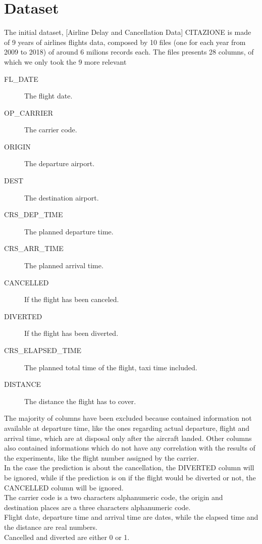 \documentclass[
	letterpaper, %
	10pt, %
]{class}
\begin{document}

\section{Dataset}

The initial dataset, [Airline Delay and Cancellation Data] CITAZIONE is made of 9 years of airlines flights data, composed by 10 files (one for each year from 2009 to 2018) of around 6 milions records each.
The files presents 28 columns, of which we only took the 9 more relevant\\

\begin{description}
	\item[FL\_DATE] The flight date.
	\item[OP\_CARRIER] The carrier code.
	\item[ORIGIN] The departure airport.
	\item[DEST] The destination airport.
	\item[CRS\_DEP\_TIME] The planned departure time.
	\item[CRS\_ARR\_TIME] The planned arrival time.
	\item[CANCELLED] If the flight has been canceled.
	\item[DIVERTED] If the flight has been diverted.
	\item[CRS\_ELAPSED\_TIME] The planned total time of the flight, taxi time included.
	\item[DISTANCE] The distance the flight has to cover.\\
\end{description}

The majority of columns have been excluded because contained information not available at departure time, like the ones regarding actual departure, flight and arrival time, which are at disposal only after the aircraft landed.
Other columns also contained informations which do not have any correlation with the results of the experiments, like the flight number assigned by the carrier.\\

In the case the prediction is about the cancellation, the DIVERTED column will be ignored, while if the prediction is on if the flight would be diverted or not, the CANCELLED column will be ignored.\\
The carrier code is a two characters alphanumeric code, the origin and destination places are a three characters alphanumeric code.\\
Flight date, departure time and arrival time are dates, while the elapsed time and the distance are real numbers.\\
Cancelled and diverted are either 0 or 1.\\
\end{document}
